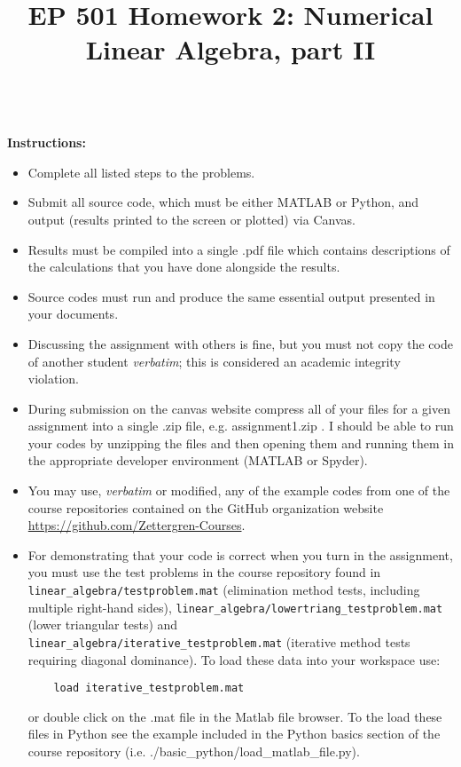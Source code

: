 \documentclass{article}
\begin{document}
\title{EP 501 Homework 2:  Numerical Linear Algebra, part II}

\maketitle

~\\
\textbf{Instructions:}  
\begin{itemize}
  \item Complete all listed steps to the problems.
  \item Submit all source code, which must be either MATLAB or Python, and output (results printed to the screen or plotted) via Canvas.  
  \item Results must be compiled into a single .pdf file which contains descriptions of the calculations that you have done alongside the results.  
  \item Source codes must run and produce the same essential output presented in your documents.  
  \item Discussing the assignment with others is fine, but you must not copy the code of another student \emph{verbatim}; this is considered an academic integrity violation.  
  \item During submission on the canvas website compress all of your files for a given assignment into a single .zip file, e.g. \textsf{assignment1.zip} .  I should be able to run your codes by unzipping the files and then opening them and running them in the appropriate developer environment (MATLAB or Spyder).  
  \item You may use, \emph{verbatim} or modified, any of the example codes from one of the course repositories contained on the GitHub organization website  \url{https://github.com/Zettergren-Courses}.
  \item For demonstrating that your code is correct when you turn in the assignment, you must use the test problems in the course repository found in \texttt{linear\_algebra/testproblem.mat} (elimination method tests, including multiple right-hand sides), \texttt{linear\_algebra/lowertriang\_testproblem.mat} (lower triangular tests) and \\ \texttt{linear\_algebra/iterative\_testproblem.mat} (iterative method tests requiring diagonal dominance).  To load these data into your workspace use:
    \begin{verbatim}
    load iterative_testproblem.mat
    \end{verbatim}
    or double click on the .mat file in the Matlab file browser.  To the load these files in Python see the example included in the Python basics section of the course repository (i.e. ./basic\_python/load\_matlab\_file.py).  
\end{itemize}
\end{document}
